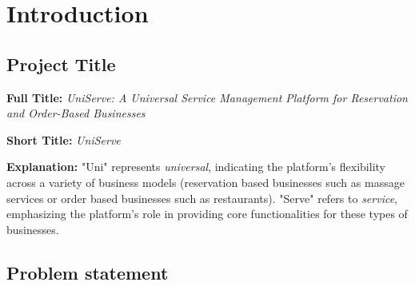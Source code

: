 \documentclass[]{VUMIFTemplateClass}
\begin{document}

\onehalfspacing


\singlespacing
{}


\tableofcontents
\onehalfspacing




\section{Introduction}
\subsection{Project Title}

\textbf{Full Title:} \textit{UniServe: A Universal Service Management Platform for Reservation and Order-Based Businesses}

\textbf{Short Title:} \textit{UniServe}


\textbf{Explanation:} "Uni" represents \emph{universal}, indicating the platform's flexibility across a variety of business models 
(reservation based businesses such as massage services or order based businesses such as restaurants). 
"Serve" refers to \emph{service}, emphasizing the platform’s role in providing core functionalities for these types of businesses.

\subsection{Problem statement}



% 


% 


% 

\end{document}
